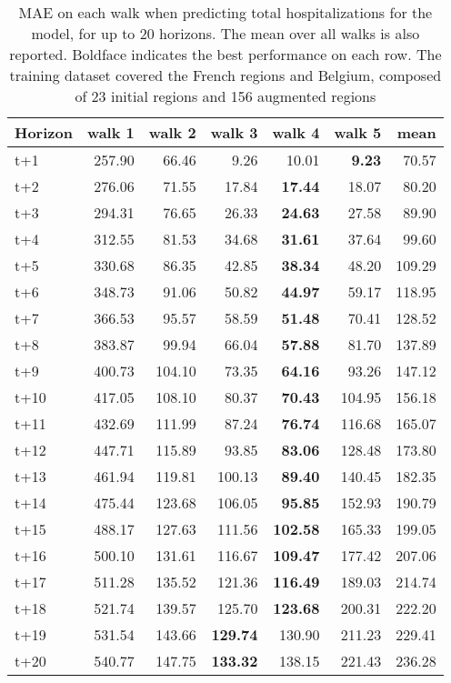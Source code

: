 \begin{table}[H]
\centering
\caption{MAE on each walk when predicting total hospitalizations for the model, for up to 20 horizons. The mean over all walks is also reported. Boldface indicates the best performance on each row. The training dataset covered the French regions and Belgium, composed of 23 initial regions and 156 augmented regions }
\label{tab:MAE_walk_baseline}
\begin{tabular}{lrrrrrr}
\toprule
Horizon &  walk 1 &  walk 2 &  walk 3 &  walk 4 &  walk 5 &   mean \\
\midrule
t+1  & 257.90  & 66.46  & 9.26  & 10.01  & \textbf{9.23}  & 70.57  \\
t+2  & 276.06  & 71.55  & 17.84  & \textbf{17.44}  & 18.07  & 80.20  \\
t+3  & 294.31  & 76.65  & 26.33  & \textbf{24.63}  & 27.58  & 89.90  \\
t+4  & 312.55  & 81.53  & 34.68  & \textbf{31.61}  & 37.64  & 99.60  \\
t+5  & 330.68  & 86.35  & 42.85  & \textbf{38.34}  & 48.20  & 109.29  \\
t+6  & 348.73  & 91.06  & 50.82  & \textbf{44.97}  & 59.17  & 118.95  \\
t+7  & 366.53  & 95.57  & 58.59  & \textbf{51.48}  & 70.41  & 128.52  \\
t+8  & 383.87  & 99.94  & 66.04  & \textbf{57.88}  & 81.70  & 137.89  \\
t+9  & 400.73  & 104.10  & 73.35  & \textbf{64.16}  & 93.26  & 147.12  \\
t+10  & 417.05  & 108.10  & 80.37  & \textbf{70.43}  & 104.95  & 156.18  \\
t+11  & 432.69  & 111.99  & 87.24  & \textbf{76.74}  & 116.68  & 165.07  \\
t+12  & 447.71  & 115.89  & 93.85  & \textbf{83.06}  & 128.48  & 173.80  \\
t+13  & 461.94  & 119.81  & 100.13  & \textbf{89.40}  & 140.45  & 182.35  \\
t+14  & 475.44  & 123.68  & 106.05  & \textbf{95.85}  & 152.93  & 190.79  \\
t+15  & 488.17  & 127.63  & 111.56  & \textbf{102.58}  & 165.33  & 199.05  \\
t+16  & 500.10  & 131.61  & 116.67  & \textbf{109.47}  & 177.42  & 207.06  \\
t+17  & 511.28  & 135.52  & 121.36  & \textbf{116.49}  & 189.03  & 214.74  \\
t+18  & 521.74  & 139.57  & 125.70  & \textbf{123.68}  & 200.31  & 222.20  \\
t+19  & 531.54  & 143.66  & \textbf{129.74}  & 130.90  & 211.23  & 229.41  \\
t+20  & 540.77  & 147.75  & \textbf{133.32}  & 138.15  & 221.43  & 236.28  \\

\bottomrule
\end{tabular}
\end{table}
